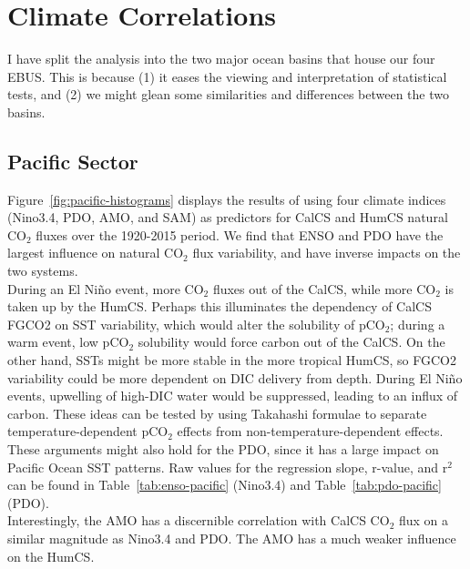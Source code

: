 \documentclass[12pt]{article}
\begin{document}
\section{Climate Correlations}
I have split the analysis into the two major ocean basins that house our four EBUS. This is because (1) it eases the viewing and interpretation of statistical tests, and (2) we might glean some similarities and differences between the two basins. 

\subsection{Pacific Sector}
Figure~\ref{fig:pacific-histograms} displays the results of using four climate indices (Nino3.4, PDO, AMO, and SAM) as predictors for CalCS and HumCS natural CO$_{2}$ fluxes over the 1920-2015 period. We find that ENSO and PDO have the largest influence on natural CO$_{2}$ flux variability, and have inverse impacts on the two systems. \\

During an El Ni\~no event, more CO$_{2}$ fluxes out of the CalCS, while more CO$_{2}$ is taken up by the HumCS. Perhaps this illuminates the dependency of CalCS FGCO2 on SST variability, which would alter the solubility of pCO$_{2}$; during a warm event, low pCO$_{2}$ solubility would force carbon out of the CalCS. On the other hand, SSTs might be more stable in the more tropical HumCS, so FGCO2 variability could be more dependent on DIC delivery from depth. During El Ni\~no events, upwelling of high-DIC water would be suppressed, leading to an influx of carbon. These ideas can be tested by using Takahashi formulae to separate temperature-dependent pCO$_{2}$ effects from non-temperature-dependent effects. These arguments might also hold for the PDO, since it has a large impact on Pacific Ocean SST patterns. Raw values for the regression slope, r-value, and r$^{2}$ can be found in Table~\ref{tab:enso-pacific} (Nino3.4) and Table~\ref{tab:pdo-pacific} (PDO). \\

Interestingly, the AMO has a discernible correlation with CalCS CO$_{2}$ flux on a similar magnitude as Nino3.4 and PDO. The AMO has a much weaker influence on the HumCS.
 
\end{document}
